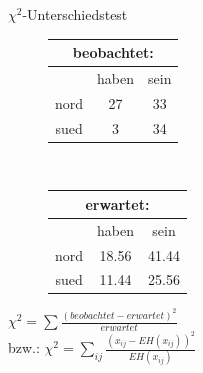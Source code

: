 \begin{frame}{$\chi^2$-Unterschiedstest}
  \begin{figure}[h]
    \centering
    \begin{tabular}{|c|c|c|}
  \multicolumn{3}{c}{beobachtet:}\\
  \hline
	&  haben & sein\\
  \hline
    nord   &  27      & 33 \\
  \hline
    sued   &   3      & 34 \\
  \hline
    \end{tabular}~~~
    \begin{tabular}{|c|c|c|}
  \multicolumn{3}{c}{erwartet:}\\
  \hline
	&  haben & sein\\
  \hline
    nord   &  18.56      & 41.44 \\
  \hline
    sued   &  11.44     & 25.56 \\
  \hline
    \end{tabular}
  \end{figure}
\pause
  \begin{center}
    $\chi^2 = \sum \frac{(beobachtet - erwartet)^2}{erwartet}$\\[3ex]
    \pause
    bzw.: \alert{$\chi^2=\sum\limits_{ij}\frac{(x_{ij}-EH(x_{ij}))^2}{EH(x_{ij})}$}
  \end{center}
\end{frame}



